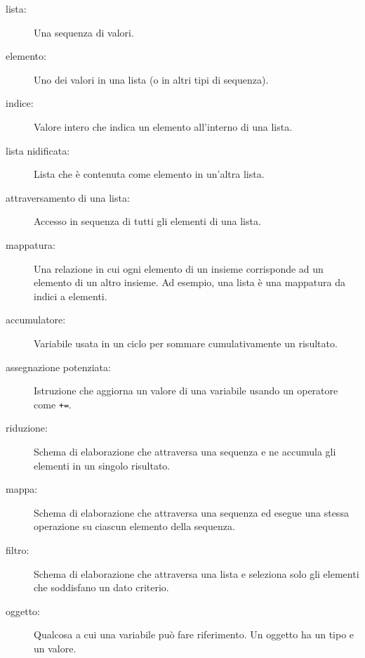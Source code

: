 \documentclass[10pt]{book}
\begin{document}
\begin{description}

\item[lista:] Una sequenza di valori.

\item[elemento:] Uno dei valori in una lista (o in altri tipi di sequenza).

\item[indice:] Valore intero che indica un elemento all'interno di una lista.

\item[lista nidificata:] Lista che è contenuta come elemento in un'altra lista.

\item[attraversamento di una lista:] Accesso in sequenza di tutti gli elementi di una lista.

\item[mappatura:] Una relazione in cui ogni elemento di un insieme corrisponde ad un elemento di un altro insieme. Ad esempio, una lista è una mappatura da indici a elementi.

\item[accumulatore:] Variabile usata in un ciclo per sommare cumulativamente un risultato.

\item[assegnazione potenziata:] Istruzione che aggiorna un valore di una variabile usando un operatore come \verb"+=".

\item[riduzione:] Schema di elaborazione che attraversa una sequenza e ne accumula gli elementi in un singolo risultato.

\item[mappa:] Schema di elaborazione che attraversa una sequenza ed esegue una stessa operazione su ciascun elemento della sequenza.

\item[filtro:] Schema di elaborazione che attraversa una lista e seleziona solo gli elementi che soddisfano un dato criterio.

\item[oggetto:] Qualcosa a cui una variabile può fare riferimento. Un oggetto ha un tipo e un valore.


\end{description}
\end{document}
